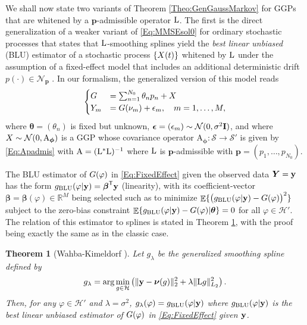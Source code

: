 \documentclass[11pt, english,english]{article}
\newtheorem{theorem}{Theorem}
\newcommand{\R}{ \mathbb{R}}
\newcommand{\Lop}{{\rm L}}
\def\V#1{{\boldsymbol{#1}}}         %
\def\Spc#1{{\mathcal{#1}}}  %
\def\M#1{{\bf{#1}}}  %
\def\Op#1{{\mathrm{#1}}}  %
\def\Exp{\mathop{\mathbb{E}}\nolimits}
\renewcommand{\[}{\begin{equation}}
\renewcommand{\]}[1]{\label{eq:#1}\end{equation}}
\def\Exp{\mathop{\mathbb{E}}\nolimits}
\def\Rand#1{{\uppercase{#1}}}         %
\def\VRand#1{{\uppercase{\boldsymbol #1}}}         %
\def\gRand#1{{\uppercase{ #1}}}         %
\newcommand{\Tr}{\mathsf{T}}
\begin{document}
We shall now state two variants of Theorem \ref{Theo:GenGaussMarkov} for GGPs that are whitened by a $\V p$-admissible operator $\Lop$.
The first is the direct generalization of a weaker variant of \eqref{Eq:MMSEsol0} for ordinary stochastic processes that states that $\Lop$-smoothing splines yield
the {\em best linear unbiased} (BLU) estimator of a stochastic process $\{\gRand X(t)\}$ whitened by $\Lop$ under the assumption of a fixed-effect model that includes an additional deterministic drift $p(\cdot) \in \Spc N_\V p$ \cite{Wahba1990,Berlinet2004}. In our formalism, the generalized version of this model reads
\begin{align}
\label{Eq:FixedEffect}
\begin{cases}\gRand G&=\sum_{n=1}^{N_0}  \theta_n p_n + \gRand X\\
\Rand Y_m&=\gRand G(\nu_m) + \epsilon_m,\quad m=1,\dots,M,
\end{cases}
\end{align}
where $\V \theta=(\theta_n)$ is fixed but unknown, $\V \epsilon=(\epsilon_m)\sim \Spc N(0,\sigma^2\M I)$, and where $\Rand X\sim \Spc N(0,\Op A_{\V \phi})$ is a GGP
whose covariance operator $\Op A_{\V \phi}: \Spc S \to \Spc S'$ is given by \eqref{Eq:Apadmis} with $\Op A=(\Lop^\ast \Lop)^{-1}$ where $\Lop$ is ${\V p}$-admissible with $\V p=(p_1, \dots,p_{N_0})$.

The BLU estimator of $\gRand G(\varphi)$ in \eqref {Eq:FixedEffect} given the observed data $\VRand Y=\M y$ has the form
$g_{\rm BLU}(\varphi|\M y)=\V \beta^\Tr \M y$ (linearity), with its coefficient-vector $\V \beta=\V \beta(\varphi) \in \R^M$ being selected such as to minimize $\Exp\{\big(g_{\rm BLU}(\varphi|\M y)- \gRand G(\varphi)\big)^2\}$ subject to the zero-bias constraint $\Exp\{g_{\rm BLU}(\varphi|\M y)- \gRand G(\varphi)|\V \theta\}=0$ for all $\varphi \in \Spc H'$. The relation of this estimator to splines is stated in Theorem \ref{Theo:WahbaKimeldorf}, with the proof
being exactly the same as in the classic case.
\begin{theorem}[Wahba-Kimeldorf \cite{Kimeldorf1971}]
\label{Theo:WahbaKimeldorf}
Let $g_\lambda$ be the generalized smoothing spline defined by
\begin{align}
g_\lambda=\arg \min_{g \in \Spc H}\left( \|\M y - \V \nu(g)\|^2_2 + \lambda \|\Lop g\|^2_{L_2}\right).
\end{align}
Then, for any $\varphi \in \Spc H'$ and $\lambda=\sigma^2$, $g_\lambda(\varphi)=g_{\rm BLU}(\varphi|\M y)$ where $g_{\rm BLU}(\varphi|\M y)$ is the {\rm best linear unbiased estimator} of $\gRand G(\varphi)$ in \eqref {Eq:FixedEffect} given $\M y$.
\end{theorem}
\end{document}
